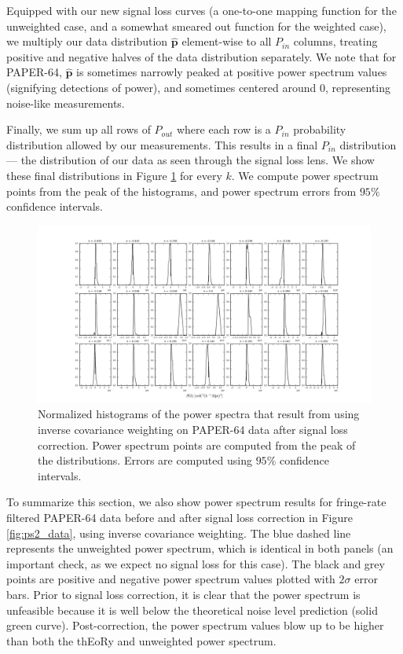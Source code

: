 \documentclass[preprint2,numberedappendix,tighten]{aastex6}  %
\begin{document}
Equipped with our new signal loss curves (a one-to-one mapping function for the unweighted case, and a somewhat smeared out function for the weighted case), we multiply our data distribution $\hat{\textbf{p}}$ element-wise to all $P_{in}$ columns, treating positive and negative halves of the data distribution separately. We note that for PAPER-64, $\hat{\textbf{p}}$ is sometimes narrowly peaked at positive power spectrum values (signifying detections of power), and sometimes centered around 0, representing noise-like measurements.

Finally, we sum up all rows of $P_{out}$ where each row is a $P_{in}$ probability distribution allowed by our measurements. This results in a final $P_{in}$ distribution --- the distribution of our data as seen through the signal loss lens. We show these final distributions in Figure \ref{fig:sigloss_datadist_inversecovariance} for every $k$. We compute power spectrum points from the peak of the histograms, and power spectrum errors from $95\%$ confidence intervals. 

\begin{figure}
	\centering
	\includegraphics[trim={1cm 0cm 1cm 1cm},width=1\textwidth]{plots/sigloss_datadist_inversecovariance.png}
	\caption{Normalized histograms of the power spectra that result from using inverse covariance weighting on PAPER-64 data after signal loss correction. Power spectrum points are computed from the peak of the distributions. Errors are computed using $95\%$ confidence intervals.}
	\label{fig:sigloss_datadist_inversecovariance}
\end{figure}

To summarize this section, we also show power spectrum results for fringe-rate filtered PAPER-64 data before and after signal loss correction in Figure \ref{fig:ps2_data}, using inverse covariance weighting. The blue dashed line represents the unweighted power spectrum, which is identical in both panels (an important check, as we expect no signal loss for this case). The black and grey points are positive and negative power spectrum values plotted with $2\sigma$ error bars. Prior to signal loss correction, it is clear that the power spectrum is unfeasible because it is well below the theoretical noise level prediction (solid green curve). Post-correction, the power spectrum values blow up to be higher than both the thEoRy and unweighted power spectrum. 
\end{document}
